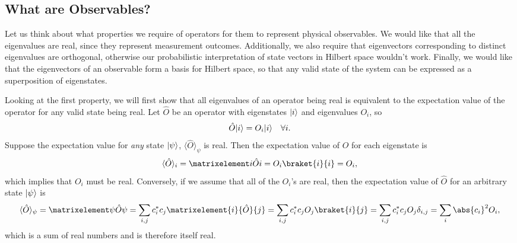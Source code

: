 \documentclass[../quantum_mechanics.tex]{subfiles}
\begin{document}
        \subsection{What are Observables?}\label{sec:hermitian-operators:subsec:what-are-observables}
            Let us think about what properties we require of operators for them to represent physical observables.
            We would like that all the eigenvalues are real, since they represent measurement outcomes.
            Additionally, we also require that eigenvectors corresponding to distinct eigenvalues are orthogonal, otherwise our probabilistic interpretation of state vectors in Hilbert space wouldn't work.
            Finally, we would like that the eigenvectors of an observable form a basis for Hilbert space, so that any valid state of the system can be expressed as a superposition of eigenstates.

            Looking at the first property, we will first show that all eigenvalues of an operator being real is equivalent to the expectation value of the operator for any valid state being real.
            Let $\hat{O}$ be an operator with eigenstates $\lvert i\rangle$ and eigenvalues $O_i$, so
            \begin{equation}
                \hat{O}\lvert i\rangle=O_i\lvert i\rangle\quad\forall i.
            \end{equation}
            Suppose the expectation value for \textit{any} state $\lvert\psi\rangle$, $\langle\hat{O}\rangle_\psi$ is real.
            Then the expectation value of $\hat{O}$ for each eigenstate is
            \begin{equation}
                \langle\hat{O}\rangle_i=\expval{\hat{O}}{i}=O_i\braket{i}{i}=O_i,
            \end{equation}
            which implies that $O_i$ must be real.
            Conversely, if we assume that all of the $O_i$'s are real, then the expectation value of $\hat{O}$ for an arbitrary state $\lvert\psi\rangle$ is
            \begin{equation}
                \langle\hat{O}\rangle_\psi=\expval{\hat{O}}{\psi}=\sum_{i,j}c_i^\ast c_j\matrixelement{i}{\hat{O}}{j}=\sum_{i,j}c_i^\ast c_j O_j\braket{i}{j}=\sum_{i,j}c_i^\ast c_j O_j\delta_{i,j}=\sum_i\abs{c_i}^2O_i,
            \end{equation}
            which is a sum of real numbers and is therefore itself real.
\end{document}
